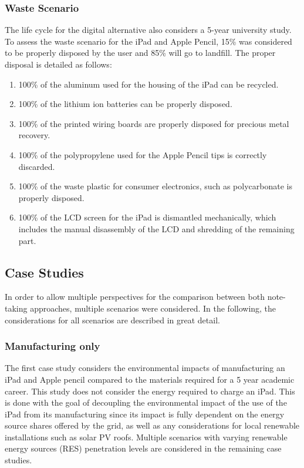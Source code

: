 \subsubsection*{Waste Scenario}
The life cycle for the digital alternative also considers a 5-year university study. To assess the waste scenario for the iPad and Apple Pencil, 15\% was considered to be properly disposed by the user and 85\% will go to landfill. The proper disposal is detailed as follows:

\begin{enumerate}
    \item 100\% of the aluminum used for the housing of the iPad can be recycled. 
    \item 100\% of the lithium ion batteries can be properly disposed. 
    \item 100\% of the printed wiring boards are properly disposed for precious metal recovery. 
    \item 100\% of the polypropylene used for the Apple Pencil tips is correctly discarded. 
    \item 100\% of the waste plastic for consumer electronics, such as polycarbonate is properly disposed. 
    \item 100\% of the LCD screen for the iPad is dismantled mechanically, which includes the manual disassembly of the LCD and shredding of the remaining part. 
\end{enumerate}

\subsection{Case Studies}\label{subsec:case_studies}
In order to allow multiple perspectives for the comparison between both note-taking approaches, multiple scenarios were considered. In the following, the considerations for all scenarios are described in great detail.

\subsubsection*{Manufacturing only}
The first case study considers the environmental impacts of manufacturing an iPad and Apple pencil compared to the materials required for a 5 year academic career. This study does not consider the energy required to charge an iPad. This is done with the goal of decoupling the environmental impact of the use of the iPad from its manufacturing since its impact is fully dependent on the energy source shares offered by the grid, as well as any considerations for local renewable installations such as solar PV roofs. Multiple scenarios with varying renewable energy sources (RES) penetration levels are considered in the remaining case studies. 


